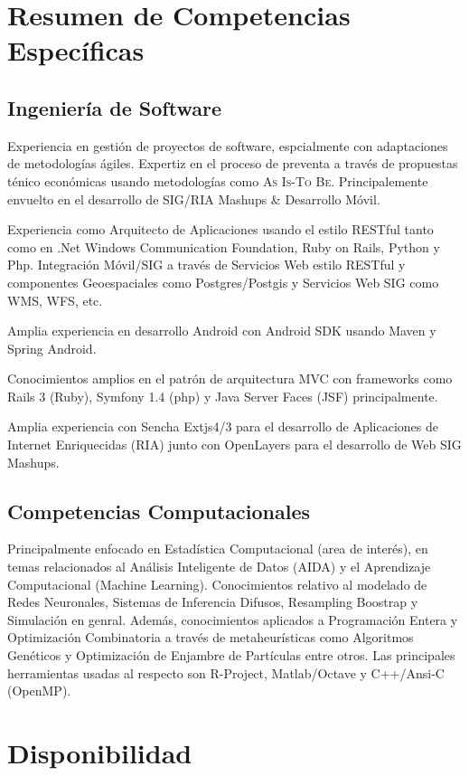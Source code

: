 \documentclass[11pt,letterpaper,roman]{moderncv}
\begin{document}
\section{Resumen de Competencias Específicas} \subsection{Ingeniería de
Software}  {Experiencia
en gestión de proyectos de software, espcialmente con adaptaciones de
metodologías ágiles. Expertiz en el proceso de preventa a través de propuestas
ténico económicas usando metodologías como \textsc{As Is-To Be}. Principalemente
envuelto en el desarrollo de SIG/RIA Mashups \& Desarrollo Móvil.}
	

 {Experiencia como Arquitecto de
Aplicaciones usando el estilo RESTful tanto como en .Net Windows Communication
Foundation, Ruby on Rails, Python y Php. Integración Móvil/SIG a través de
Servicios Web estilo RESTful y componentes Geoespaciales como Postgres/Postgis y
Servicios Web SIG como WMS, WFS, etc.}
	

 {Amplia experiencia en desarrollo Android con Android
SDK usando Maven y Spring Android.}

 {Conocimientos amplios en el patrón de arquitectura
MVC con frameworks como Rails 3 (Ruby), Symfony 1.4 (php) y Java Server Faces
(JSF) principalmente.}


 {Amplia experiencia con Sencha Extjs4/3 para el
desarrollo de Aplicaciones de Internet Enriquecidas (RIA) junto con OpenLayers
para el desarrollo de Web SIG Mashups. }

\subsection{Competencias Computacionales}  {Principalmente enfocado en Estadística Computacional (area de
interés), en temas relacionados al Análisis Inteligente de Datos (AIDA) y el
Aprendizaje Computacional (Machine Learning). Conocimientos relativo al modelado
de Redes Neuronales, Sistemas de Inferencia Difusos, Resampling Boostrap y
Simulación en genral. Además, conocimientos aplicados a Programación Entera y
Optimización Combinatoria a través de metaheurísticas como Algoritmos Genéticos
y Optimización de Enjambre de Partículas entre otros. Las principales
herramientas usadas al respecto son R-Project, Matlab/Octave y C++/Ansi-C
(OpenMP).}

\section{Disponibilidad}  
\end{document}
